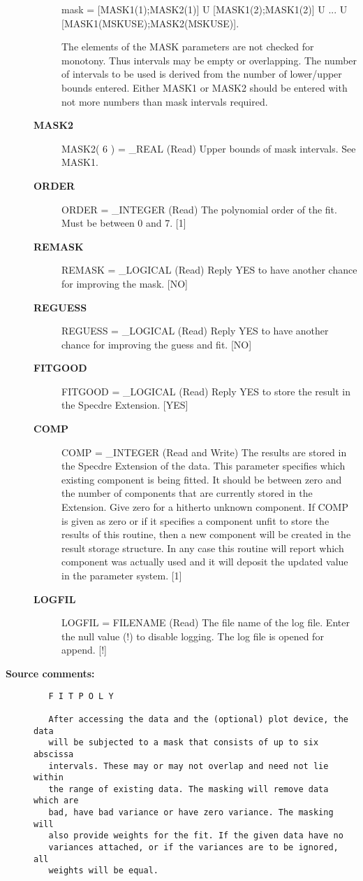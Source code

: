 \begin{description}
\begin{description}
      mask = [MASK1(1);MASK2(1)] U [MASK1(2);MASK1(2)]
           U ...
           U [MASK1(MSKUSE);MASK2(MSKUSE)].

   The elements of the MASK parameters are not checked for
   monotony. Thus intervals may be empty or overlapping. The
   number of intervals to be used is derived from the number of
   lower/upper bounds entered. Either MASK1 or MASK2 should be
   entered with not more numbers than mask intervals required.
\item [{\bf MASK2}]
MASK2( 6 ) = _REAL (Read)
   Upper bounds of mask intervals. See MASK1.
\item [{\bf ORDER}]
ORDER = _INTEGER (Read)
   The polynomial order of the fit. Must be between 0 and 7. [1]
\item [{\bf REMASK}]
REMASK = _LOGICAL (Read)
   Reply YES to have another chance for improving the mask.
   [NO]
\item [{\bf REGUESS}]
REGUESS = _LOGICAL (Read)
   Reply YES to have another chance for improving the guess and
   fit. [NO]
\item [{\bf FITGOOD}]
FITGOOD = _LOGICAL (Read)
   Reply YES to store the result in the Specdre Extension. [YES]
\item [{\bf COMP}]
COMP = _INTEGER (Read and Write)
   The results are stored in the Specdre Extension of the data.
   This parameter specifies which existing component is being
   fitted. It should be between zero and the number of components
   that are currently stored in the Extension. Give zero for a
   hitherto unknown component. If COMP is given as zero or if it
   specifies a component unfit to store the results of this
   routine, then a new component will be created in the result
   storage structure. In any case this routine will report which
   component was actually used and it will deposit the updated
   value in the parameter system. [1]
\item [{\bf LOGFIL}]
LOGFIL = FILENAME (Read)
   The file name of the log file. Enter the null value (!) to
   disable logging. The log file is opened for append. [!]

\end{description}

\item [{\bf Source comments:}]
\begin{verbatim}
   F I T P O L Y

   After accessing the data and the (optional) plot device, the data
   will be subjected to a mask that consists of up to six abscissa
   intervals. These may or may not overlap and need not lie within
   the range of existing data. The masking will remove data which are
   bad, have bad variance or have zero variance. The masking will
   also provide weights for the fit. If the given data have no
   variances attached, or if the variances are to be ignored, all
   weights will be equal.


\end{verbatim}
\end{description}
